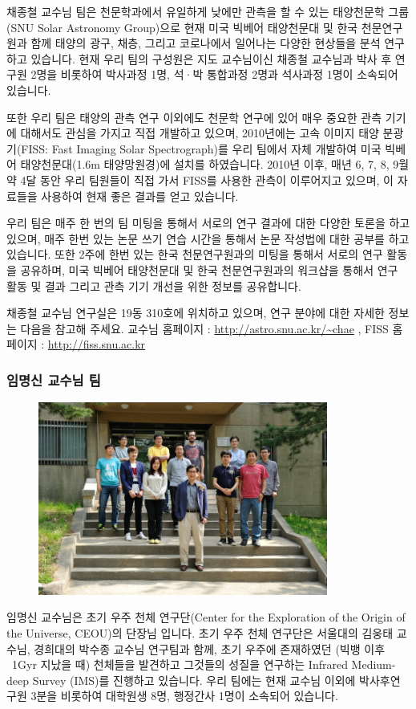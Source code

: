 채종철 교수님 팀은 천문학과에서 유일하게 낮에만 관측을 할 수 있는 태양천문학 그룹(SNU Solar Astronomy Group)으로 현재 미국 빅베어 태양천문대 및 한국 천문연구원과 함께 태양의 광구, 채층, 그리고 코로나에서 일어나는 다양한 현상들을 분석 연구하고 있습니다. 현재 우리 팀의 구성원은 지도 교수님이신 채종철 교수님과 박사 후 연구원 2명을 비롯하여 박사과정 1명, 석·박 통합과정 2명과 석사과정 1명이 소속되어 있습니다.

또한 우리 팀은 태양의 관측 연구 이외에도 천문학 연구에 있어 매우 중요한 관측 기기에 대해서도 관심을 가지고 직접 개발하고 있으며, 2010년에는 고속 이미지 태양 분광기(FISS: Fast Imaging Solar Spectrograph)를 우리 팀에서 자체 개발하여 미국 빅베어 태양천문대(1.6m 태양망원경)에 설치를 하였습니다. 2010년 이후, 매년 6, 7, 8, 9월 약 4달 동안 우리 팀원들이 직접 가서 FISS를 사용한 관측이 이루어지고 있으며, 이 자료들을 사용하여 현재 좋은 결과를 얻고 있습니다. 

우리 팀은 매주 한 번의 팀 미팅을 통해서 서로의 연구 결과에 대한 다양한 토론을 하고 있으며, 매주 한번 있는 논문 쓰기 연습 시간을 통해서 논문 작성법에 대한 공부를 하고 있습니다. 또한 2주에 한번 있는 한국 천문연구원과의 미팅을 통해서 서로의 연구 활동을 공유하며, 미국 빅베어 태양천문대 및 한국 천문연구원과의 워크샵을 통해서 연구 활동 및 결과 그리고 관측 기기 개선을 위한 정보를 공유합니다.

채종철 교수님 연구실은 19동 310호에 위치하고 있으며, 연구 분야에 대한 자세한 정보는 다음을 참고해 주세요. 교수님 홈페이지 : \url{http://astro.snu.ac.kr/~chae} , FISS 홈페이지 : \url{http://fiss.snu.ac.kr}

\subsubsection{임명신 교수님 팀}
\begin{figure}
\begin{center}
\includegraphics[width=0.85\textwidth]{./Figures/team-im-2014-1.jpg}
\end{center}
\end{figure}
임명신 교수님은 초기 우주 천체 연구단(Center for the Exploration of the Origin of the Universe, CEOU)의 단장님 입니다. 초기 우주 천체 연구단은 서울대의 김웅태 교수님, 경희대의 박수종 교수님 연구팀과 함께, 초기 우주에 존재하였던 (빅뱅 이후 ~1Gyr 지났을 때) 천체들을 발견하고 그것들의 성질을 연구하는 Infrared Medium-deep Survey (IMS)를 진행하고 있습니다. 
우리 팀에는 현재 교수님 이외에 박사후연구원 3분을 비롯하여 대학원생 8명, 행정간사 1명이 소속되어 있습니다.

